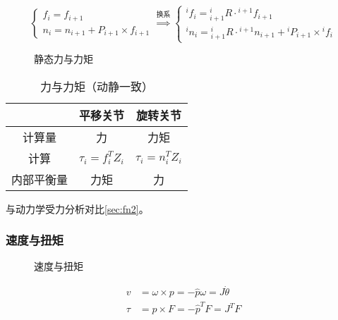\documentclass[
12pt, %
a4paper, 
oneside, %
headinclude,footinclude, %
]{scrartcl}
\begin{document}
$$
\begin{cases}
f_i = f_{i + 1} \\
n_i = n_{i + 1} + P_{i + 1} \times f_{i + 1}
\end{cases}
\overset{\text{换系}}{\Longrightarrow}
\begin{cases}
{}^i f_i = {}^i_{i + 1}R \cdot {}^{i + 1} f_{i + 1} \\
{}^i n_i = {}^i_{i + 1}R \cdot {}^{i + 1} n_{i + 1} + {}^i P_{i + 1} \times {}^i f_i
\end{cases}
$$
\noindent
\begin{minipage}{0.65\textwidth}
\begin{figure}[H]
\centering
{} \quad
{} \quad
{}
\caption{静态力与力矩}
\end{figure}
\end{minipage}
\begin{minipage}{0.35\textwidth}
\begin{table}[H]
\centering
\begin{tabular}{c|cc}
\hline
& 平移关节 & 旋转关节 \\
\hline
计算量 & 力 & 力矩 \\
计算 & $ \tau_i = f_i^T Z_i $ & $ \tau_i = n_i^T Z_i $ \\
内部平衡量 & 力矩 & 力 \\
\hline
\end{tabular}
\caption{力与力矩（动静一致）}
\end{table}
\end{minipage}

与动力学受力分析对比\ref{sec:fn2}。
\subsubsection[速度与扭矩]{速度与扭矩}
\noindent
\begin{minipage}{0.6\textwidth}
\begin{figure}[H]
\centering
\subfloat[角速度与线速度]{\texttt{[image: wv]}} \quad
\subfloat[力与扭矩]{\texttt{[image: ft]}}
\caption{速度与扭矩}
\end{figure}
\end{minipage}
\begin{minipage}{0.4\textwidth}
\begin{align*}
v &= \omega \times p = -\hat{p} \omega = J \dot{\theta} \\
\tau &= p \times F = -\hat{p}^T F = J^T F
\end{align*}
\end{minipage}
\end{document}

